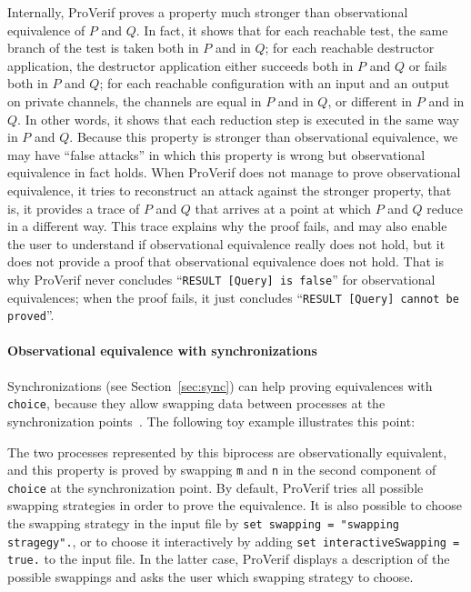 \documentclass{book}
\begin{document}
Internally, ProVerif proves a property much stronger than
observational equivalence of $P$ and $Q$. In fact, it shows that for
each reachable test, the same branch of the test is taken both in $P$
and in $Q$; for each reachable destructor application, the destructor
application either succeeds both in $P$ and $Q$ or fails both in $P$
and $Q$; for each reachable configuration with an input and an output
on private channels, the channels are equal in $P$ and in $Q$, or
different in $P$ and in $Q$. In other words, it shows that each
reduction step is executed in the same way in $P$ and $Q$. Because
this property is stronger than observational equivalence, we may have
``false attacks'' in which this property is wrong but observational
equivalence in fact holds. When ProVerif does not manage to prove
observational equivalence, it tries to reconstruct an attack against
the stronger property, that is, it provides a trace of $P$ and $Q$ that
arrives at a point at which $P$ and $Q$ reduce in a different way.
This trace explains why the proof fails, and may also enable the user
to understand if observational equivalence really does not hold, but it
does not provide a proof that observational equivalence does not hold.
That is why ProVerif never concludes ``\lstinline!RESULT [Query] is false!''
for observational equivalences; when the proof fails, it just
concludes ``\lstinline!RESULT [Query] cannot be proved!''.

\paragraph{Observational equivalence with synchronizations}\label{sec:obseq-sync}

Synchronizations (see Section~\ref{sec:sync})
can help proving equivalences with \lstinline!choice!, because they allow
swapping data between processes at the synchronization
points~\cite{BlanchetSmythCSF16}.
The following toy example illustrates this point:

The two processes represented by this biprocess are observationally equivalent,
and this property
is proved by swapping \lstinline!m! and \lstinline!n! in the second component
of \lstinline!choice! at the synchronization point. By default, ProVerif tries
all possible swapping strategies in order to prove the equivalence.
It is also possible to choose the swapping strategy in the input file
by \lstinline!set swapping = "swapping stragegy".!, or to choose
it interactively by adding \lstinline!set interactiveSwapping = true.!
to the input file. In the latter case, ProVerif displays a description
of the possible swappings and asks the user which swapping strategy to choose.
\end{document}
